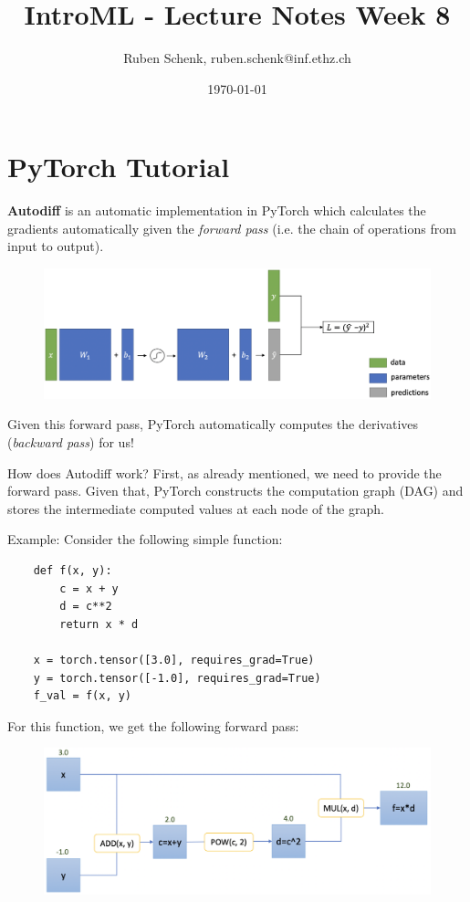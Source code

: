 \documentclass[a4paper]{extarticle}
\title{IntroML - Lecture Notes Week 8}
\author{Ruben Schenk, ruben.schenk@inf.ethz.ch}
\date{\today}
\begin{document}
\maketitle

\section{PyTorch Tutorial}

\textbf{Autodiff} is an automatic implementation in PyTorch which calculates the gradients automatically given the \textit{forward pass} (i.e. the chain of operations from input to output).

\begin{figure}[H]
    \includegraphics[width=15cm]{../images/IntroML_Fig8-1}
    \centering
\end{figure}

Given this forward pass, PyTorch automatically computes the derivatives (\textit{backward pass}) for us!

How does Autodiff work? First, as already mentioned, we need to provide the forward pass. Given that, PyTorch constructs the computation graph (DAG) and stores the intermediate computed values at each node of the graph.

Example: Consider the following simple function:
\begin{verbatim}
    def f(x, y):
        c = x + y
        d = c**2
        return x * d

    x = torch.tensor([3.0], requires_grad=True)
    y = torch.tensor([-1.0], requires_grad=True)
    f_val = f(x, y)
\end{verbatim}

For this function, we get the following forward pass:

\begin{figure}[H]
    \includegraphics[width=15cm]{../images/IntroML_Fig8-2}
    \centering
\end{figure}
\end{document}
